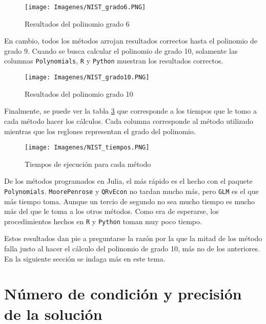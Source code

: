 \begin{figure}[h]
\begin{center}
\texttt{[image: Imagenes/NIST\_grado6.PNG]}
\caption{Resultados del polinomio grado 6}
\label{NIST_res_gr6}
\end{center}
\end{figure}

En cambio, todos los métodos arrojan resultados correctos hasta el polinomio de grado 9. Cuando se busca calcular el polinomio de grado 10, solamente las columnas \texttt{Polynomials}, \texttt{R} y \texttt{Python} muestran los resultados correctos. 

\begin{figure}[h]
\begin{center}
\texttt{[image: Imagenes/NIST\_grado10.PNG]}
\caption{Resultados del polinomio grado 10}
\label{NIST_res_gr10}
\end{center}
\end{figure}

Finalmente, se puede ver la tabla \ref{NIST_tiempos} que corresponde a los tiempos que le tomo a cada método hacer los cálculos. Cada columna corresponde al método utilizado mientras que los reglones representan el grado del polinomio. 


\begin{figure}[h]
\begin{center}
\texttt{[image: Imagenes/NIST\_tiempos.PNG]}
\caption{Tiempos de ejecución para cada método}
\label{NIST_tiempos}
\end{center}
\end{figure}

De los métodos programados en \textsf{Julia}, el más rápido es el hecho con el paquete \texttt{Polynomials}. \texttt{MoorePenrose} y \texttt{QRvEcon} no tardan mucho más, pero \texttt{GLM} es el que más tiempo toma. Aunque un tercio de segundo no sea mucho tiempo es mucho más del que le toma a los otros métodos. Como era de esperarse, los procedimientos hechos en \texttt{R} y \texttt{Python} toman muy poco tiempo. 

Estos resultados dan pie a preguntarse la razón por la que la mitad de los método falla justo al hacer el cálculo del polinomio de grado 10, más no de los anteriores. En la siguiente sección se indaga más en este tema. 

\section{Número de condición y precisión de la solución}

